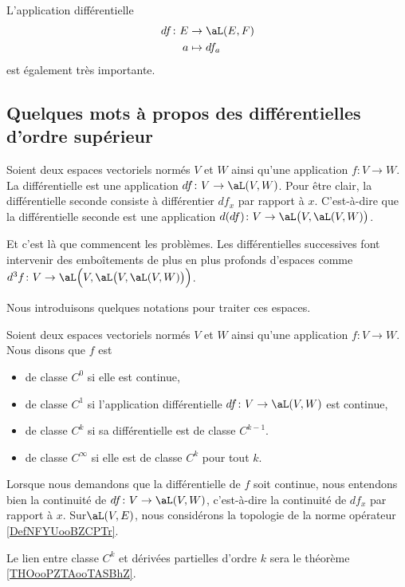 L'application différentielle
\begin{equation}
	\begin{aligned}
		df\colon E & \to \aL(E,F) \\
		a          & \mapsto df_a
	\end{aligned}
\end{equation}
est également très importante.


\subsection{Quelques mots à propos des différentielles d'ordre supérieur}

Soient deux espaces vectoriels normés \( V\) et \( W\) ainsi qu'une application \( f\colon V\to W\). La différentielle est une application \( df\colon V\to \aL(V,W)\). Pour être clair, la différentielle seconde consiste à différentier \( df_x\) par rapport à \( x\). C'est-à-dire que la différentielle seconde est une application \( d(df)\colon V\to \aL\big( V,\aL(V,W) \big)\).

Et c'est là que commencent les problèmes. Les différentielles successives font intervenir des emboîtements de plus en plus profonds d'espaces comme \( d^3f\colon V\to \aL\Big( V,\aL\big( V,\aL(V,W) \big) \Big)\).

Nous introduisons quelques notations pour traiter ces espaces.

\begin{definition}  \label{DefPNjMGqy}
	Soient deux espaces vectoriels normés \( V\) et \( W\) ainsi qu'une application \( f\colon V\to W\). Nous disons que \( f\) est
	\begin{itemize}
		\item de classe  \( C^0\) si elle est continue,
		\item de classe \( C^1\) si l'application différentielle \( df\colon V\to \aL(V,W)\) est continue,
		\item de classe \( C^k\) si sa différentielle est de classe \( C^{k-1}\).
		\item de classe \( C^{\infty}\) si elle est de classe \( C^k\) pour tout \( k\).
	\end{itemize}

	Lorsque nous demandons que la différentielle de \( f\) soit continue, nous entendons bien la continuité de \( df\colon V\to \aL(V,W)\), c'est-à-dire la continuité de \( df_x\) par rapport à \( x\). Sur\( \aL(V,E)\), nous considérons la topologie de la norme opérateur \ref{DefNFYUooBZCPTr}.

\end{definition}
Le lien entre classe \( C^k\) et dérivées partielles d'ordre \( k\) sera le théorème \ref{THOooPZTAooTASBhZ}.

